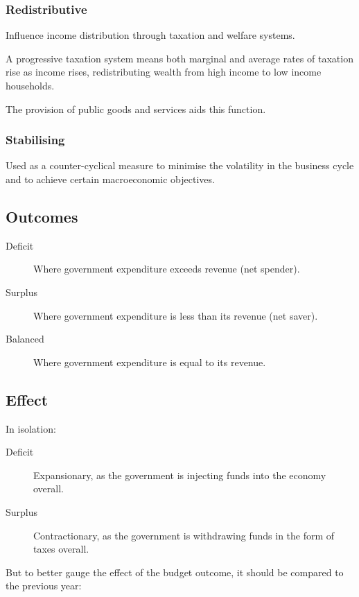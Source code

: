 \documentclass[a4paper,11pt]{report}
\begin{document}
\subsubsection{Redistributive}

Influence income distribution through taxation and welfare systems.

A progressive taxation system means both marginal and average rates of taxation
rise as income rises, redistributing wealth from high income to low income
households.

The provision of public goods and services aids this function.

\subsubsection{Stabilising}

Used as a counter-cyclical measure to minimise the volatility in the business
cycle and to achieve certain macroeconomic objectives.

\subsection{Outcomes}

\begin{description}
\item [Deficit] Where government expenditure exceeds revenue (net spender).
\item [Surplus] Where government expenditure is less than its revenue (net
	saver).
\item [Balanced] Where government expenditure is equal to its revenue.
\end{description}

\subsection{Effect}

In isolation:

\begin{description}
\item [Deficit] Expansionary, as the government is injecting funds into the
	economy overall.
\item [Surplus] Contractionary, as the government is withdrawing funds in the
	form of taxes overall.
\end{description}

But to better gauge the effect of the budget outcome, it should be compared to
the previous year:
\end{document}
